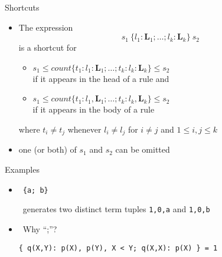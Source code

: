\begin{frame}{Shortcuts}
  \begin{itemize}
  \item The expression
    \[
    s_1~\{ l_1:\boldsymbol{L}_1;\dots;l_k:\boldsymbol{L}_k\}~s_2
    \]
    is a shortcut for

    \begin{itemize}
    \item
      \(
      s_1\leq\mathit{count}\{t_1:l_1:\boldsymbol{L}_1;\dots;t_k:l_k:\boldsymbol{L}_k\}\leq s_2
      \)
      \\\smallskip
      if it appears in the head of a rule and
      \\\medskip
    \item
      \(
      s_1\leq\mathit{count}\{t_1:l_1,\boldsymbol{L}_1;\dots;t_k:l_k,\boldsymbol{L}_k\}\leq s_2
      \)
      \\\smallskip
      if it appears in the body of a rule
    \end{itemize}
    where $t_i\neq t_j$ whenever $l_i\neq l_j$ for $i\neq j$ and $1\leq i,j\leq k$
  \item<2->  one (or both) of $s_1$ and $s_2$ can be omitted
  \end{itemize}
\end{frame}
\begin{frame}[fragile]{Examples}
  \begin{itemize}
  \item<2->  \ \texttt{\{a; b\}}

\begin{semiverbatim}
\end{semiverbatim}
\pause[4]
\gringo\ generates two distinct term tuples \lstinline{1,0,a} and \lstinline{1,0,b}
\medskip
\item<5->  \ Why ``;''?
\begin{lstlisting}[basicstyle=\ttfamily\small]
  { q(X,Y): p(X), p(Y), X < Y; q(X,X): p(X) } = 1
\end{lstlisting}
  \end{itemize}
\end{frame}

